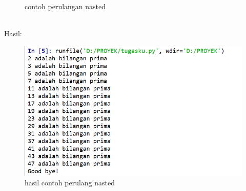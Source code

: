 \begin{enumerate}
\begin{itemize}
\begin{figure}[!htbp]
\caption{contoh perulangan nasted}
\end{figure}\\
Hasil:
\begin{figure}[!htbp]
\centering
\includegraphics[width=13cm]{gambar2/nasted1.png}
\caption{hasil contoh perulang nasted}
\end{figure}
\end{itemize}


\end{enumerate}
